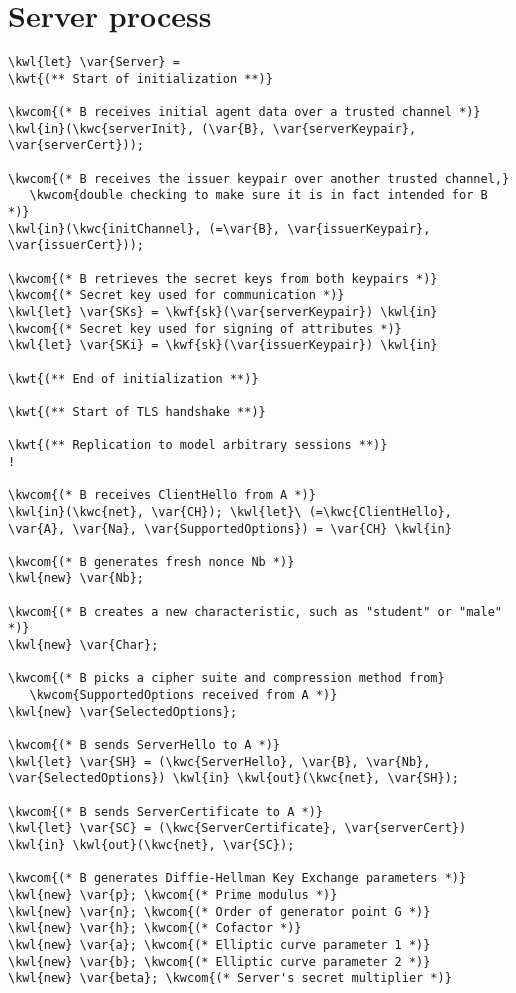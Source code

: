 \section{Server process}
\begin{Verbatim}[commandchars=\\\{\},codes={\catcode`$=3}]
\kwl{let} \var{Server} = 
\kwt{(** Start of initialization **)}

\kwcom{(* B receives initial agent data over a trusted channel *)}
\kwl{in}(\kwc{serverInit}, (\var{B}, \var{serverKeypair}, \var{serverCert}));

\kwcom{(* B receives the issuer keypair over another trusted channel,}
   \kwcom{double checking to make sure it is in fact intended for B *)}
\kwl{in}(\kwc{initChannel}, (=\var{B}, \var{issuerKeypair}, \var{issuerCert}));

\kwcom{(* B retrieves the secret keys from both keypairs *)}
\kwcom{(* Secret key used for communication *)}
\kwl{let} \var{SKs} = \kwf{sk}(\var{serverKeypair}) \kwl{in}
\kwcom{(* Secret key used for signing of attributes *)}
\kwl{let} \var{SKi} = \kwf{sk}(\var{issuerKeypair}) \kwl{in}

\kwt{(** End of initialization **)}

\kwt{(** Start of TLS handshake **)}

\kwt{(** Replication to model arbitrary sessions **)}
!

\kwcom{(* B receives ClientHello from A *)}
\kwl{in}(\kwc{net}, \var{CH}); \kwl{let}\ (=\kwc{ClientHello}, \var{A}, \var{Na}, \var{SupportedOptions}) = \var{CH} \kwl{in}

\kwcom{(* B generates fresh nonce Nb *)}
\kwl{new} \var{Nb}; 

\kwcom{(* B creates a new characteristic, such as "student" or "male" *)}
\kwl{new} \var{Char};

\kwcom{(* B picks a cipher suite and compression method from}
   \kwcom{SupportedOptions received from A *)}
\kwl{new} \var{SelectedOptions};

\kwcom{(* B sends ServerHello to A *)}
\kwl{let} \var{SH} = (\kwc{ServerHello}, \var{B}, \var{Nb}, \var{SelectedOptions}) \kwl{in} \kwl{out}(\kwc{net}, \var{SH});

\kwcom{(* B sends ServerCertificate to A *)}
\kwl{let} \var{SC} = (\kwc{ServerCertificate}, \var{serverCert}) \kwl{in} \kwl{out}(\kwc{net}, \var{SC});

\kwcom{(* B generates Diffie-Hellman Key Exchange parameters *)}
\kwl{new} \var{p}; \kwcom{(* Prime modulus *)}
\kwl{new} \var{n}; \kwcom{(* Order of generator point G *)}
\kwl{new} \var{h}; \kwcom{(* Cofactor *)}
\kwl{new} \var{a}; \kwcom{(* Elliptic curve parameter 1 *)}
\kwl{new} \var{b}; \kwcom{(* Elliptic curve parameter 2 *)}
\kwl{new} \var{beta}; \kwcom{(* Server's secret multiplier *)}


\end{Verbatim}
